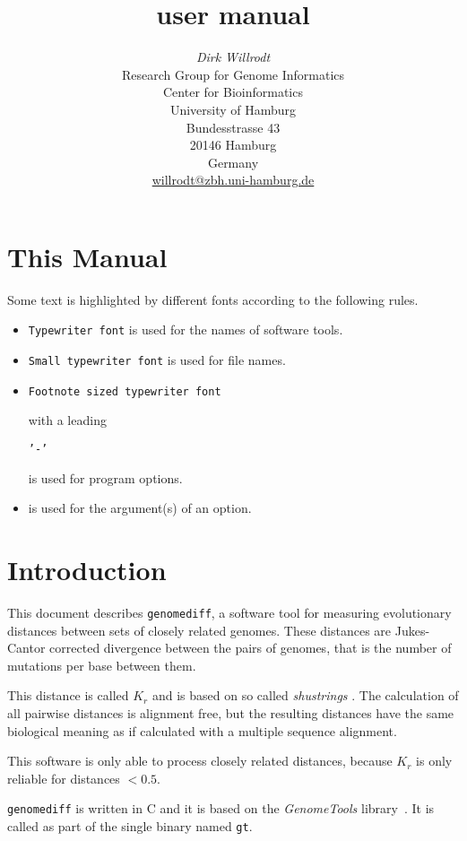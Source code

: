 \documentclass[12pt,titlepage]{article}
\title{\Gdiff user manual}
\author{\begin{tabular}{c}
  \textit{Dirk Willrodt}\\[1cm]
  Research Group for Genome Informatics\\
  Center for Bioinformatics\\
  University of Hamburg\\
  Bundesstrasse 43\\
  20146 Hamburg\\
  Germany\\[1cm]
  \url{willrodt@zbh.uni-hamburg.de}\\
\end{tabular}}
\newcommand{\Gdiff}{\texttt{genomediff}\xspace}
\newcommand{\GenomeTools}{\textit{GenomeTools}\xspace}
\newcommand{\Gt}{\texttt{gt}\xspace}
\newcommand{\Kr}{\ensuremath{K_r}\xspace}
\newcommand{\File}[1]{\texttt{\small #1}}
\newcommand{\ShuS}{\textit{shustrings}\xspace}
\begin{document}
\maketitle

\section*{This Manual}
Some text is highlighted by different fonts according to the following rules.

\begin{itemize}
\item \texttt{Typewriter font} is used for the names of software tools.
\item \File{Small typewriter font} is used for file names.
\item \begin{footnotesize}\texttt{Footnote sized typewriter font}
      \end{footnotesize} with a leading
      \begin{footnotesize}\texttt{'-'}\end{footnotesize}
      is used for program options.
\item {} is used for the argument(s) of an
      option.
\end{itemize}


\section{Introduction}

This document describes \Gdiff, a software tool for measuring evolutionary
distances between sets of closely related genomes. These distances are Jukes-Cantor
corrected divergence between the pairs of genomes, that is the number of
mutations per base between them.

This distance is called \Kr and is based on so called \ShuS
\cite{HAU:DOM:WIE:2008,HAU:PFA:DOM:WIE:2009,HAU:REE:PFA:2011}. The calculation
of all pairwise distances is alignment free, but the resulting distances have
the same biological meaning as if calculated with a multiple sequence alignment.

This software is only able to process closely related distances, because \Kr is
only reliable for distances $<0.5$.

\Gdiff is written in C and it is based on the \GenomeTools
library~\cite{genometools}. It is called as part of the single binary named \Gt.
\end{document}
